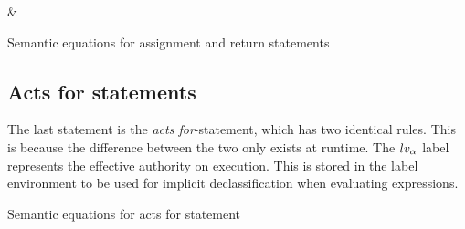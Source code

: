 \begin{table}[H]
\begin{semanticequations}
 \seSpace
& \seSpace
\end{semanticequations}
\caption{Semantic equations for assignment and return statements}
\label{cstr:assignment_return}
\end{table}

\subsection{Acts for statements}
The last statement is the \emph{acts for}-statement, which has two identical rules.
This is because the difference between the two only exists at runtime.
The $lv_\alpha$ label represents the effective authority on execution.
This is stored in the label environment to be used for implicit declassification when evaluating expressions.

\begin{table}[H]
\begin{semanticequations}
 \seSpace
\end{semanticequations}
\caption{Semantic equations for acts for statement}
\label{cstr:actsfor}
\end{table}

